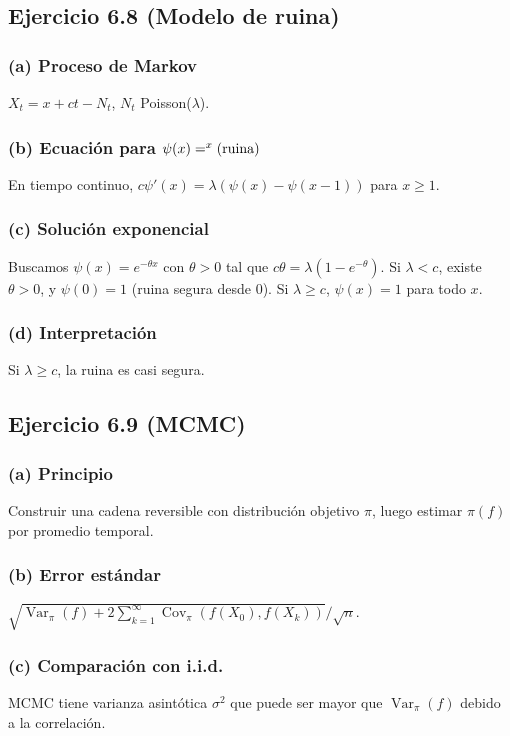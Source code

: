 \documentclass[12pt]{article}
\let\P\relax
\newcommand{\P}{\mathbb{P}}
\newcommand{\1}{\mathbf{1}}
\newcommand{\Var}{\operatorname{Var}}
\newcommand{\Cov}{\operatorname{Cov}}
\begin{document}
\subsection{Ejercicio 6.8 (Modelo de ruina)}

\subsubsection*{(a) Proceso de Markov}
$X_t=x+ct-N_t$, $N_t$ Poisson($\lambda$).

\subsubsection*{(b) Ecuaci\'on para $\psi(x)=\P^x(\text{ruina})$}
En tiempo continuo, $c\psi'(x)=\lambda(\psi(x)-\psi(x-1))$ para $x\ge1$.

\subsubsection*{(c) Soluci\'on exponencial}
Buscamos $\psi(x)=e^{-\theta x}$ con $\theta>0$ tal que $c\theta=\lambda(1-e^{-\theta})$. Si $\lambda<c$, existe $\theta>0$, y $\psi(0)=1$ (ruina segura desde 0). Si $\lambda\ge c$, $\psi(x)=1$ para todo $x$.

\subsubsection*{(d) Interpretaci\'on}
Si $\lambda\ge c$, la ruina es casi segura.

\subsection{Ejercicio 6.9 (MCMC)}

\subsubsection*{(a) Principio}
Construir una cadena reversible con distribuci\'on objetivo $\pi$, luego estimar $\pi(f)$ por promedio temporal.

\subsubsection*{(b) Error est\'andar}
$\sqrt{\Var_\pi(f)+2\sum_{k=1}^\infty\Cov_\pi(f(X_0),f(X_k))}/\sqrt{n}$.

\subsubsection*{(c) Comparaci\'on con i.i.d.}
MCMC tiene varianza asint\'otica $\sigma^2$ que puede ser mayor que $\Var_\pi(f)$ debido a la correlaci\'on.
\end{document}
